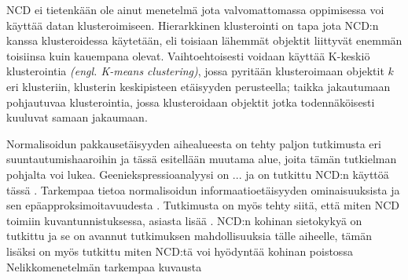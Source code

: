 \documentclass[12pt,finnish]{tktltiki2}
\theoremstyle{definition}
\theoremstyle{remark}
\newcommand{\engl}[1]{\emph{(engl. #1)}}
\begin{document}
  NCD ei tietenkään ole ainut menetelmä jota valvomattomassa oppimisessa voi käyttää datan klusteroimiseen.
  Hierarkkinen klusterointi on tapa jota NCD:n kanssa klusteroidessa käytetään, eli toisiaan lähemmät objektit liittyvät enemmän toisiinsa kuin kauempana olevat. Vaihtoehtoisesti voidaan käyttää K-keskiö klusterointia \engl{K-means clustering}, jossa pyritään klusteroimaan objektit $k$ eri klusteriin, klusterin keskipisteen etäisyyden perusteella; taikka jakautumaan pohjautuvaa klusterointia, jossa klusteroidaan objektit jotka todennäköisesti kuuluvat samaan jakaumaan.

  Normalisoidun pakkausetäisyyden aihealueesta on tehty paljon tutkimusta eri suuntautumishaaroihin ja tässä esitellään muutama alue, joita tämän tutkielman pohjalta voi lukea.
  Geeniekspressioanalyysi on ... ja on tutkittu NCD:n käyttöä tässä \cite{nykter2005normalized}.
  Tarkempaa tietoa normalisoidun informaatioetäisyyden ominaisuuksista ja sen epäapproksimoitavuudesta \cite{terwijn2011nonapproximability}.
  Tutkimusta on myös tehty siitä, että miten NCD toimiin kuvantunnistuksessa, asiasta lisää \cite{doi:10.1117/12.704334}.
  NCD:n kohinan sietokykyä on tutkittu ja se on avannut tutkimuksen mahdollisuuksia tälle aiheelle, tämän lisäksi on myös tutkittu miten NCD:tä voi hyödyntää kohinan poistossa \cite{vitanyi2013similarity}
  Nelikkomenetelmän tarkempaa kuvausta \cite{cilibrasi2011fast}


%
%

%

% 





%
\end{document}
